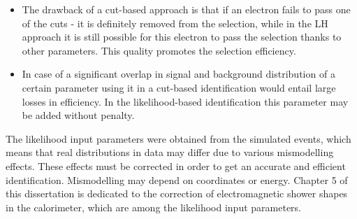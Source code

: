    \begin{itemize}
    	\item The drawback of a cut-based approach is that if an electron fails to pass one of the cuts - it is definitely removed from the selection, while in the LH approach it is still possible for this electron to pass the selection thanks to other parameters. This quality promotes the selection efficiency. 
    	\item In case of a significant overlap in signal and background distribution of a certain parameter using it in a cut-based identification would entail large losses in efficiency. In the likelihood-based identification this parameter may be added without penalty. 
	\end{itemize}
	The likelihood input parameters were obtained from the simulated events, which means that real distributions in data may differ due to various mismodelling effects. These effects must be corrected in order to get an accurate and efficient identification. Mismodelling may depend on coordinates or energy. Chapter 5 of this dissertation is dedicated to the correction of electromagnetic shower shapes in the calorimeter, which are among the likelihood input parameters.
